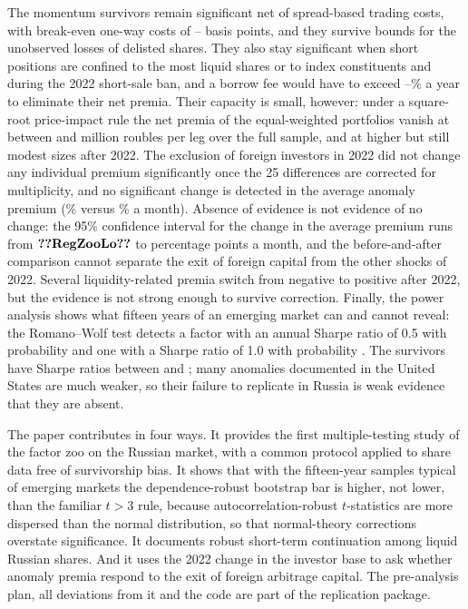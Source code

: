 \documentclass[11pt]{article}
\newcommand{\RW}{Romano--Wolf}
\begin{document}
The momentum survivors remain significant net of spread-based trading costs, with break-even one-way
costs of -- basis points, and they survive bounds for the unobserved losses of delisted
shares. They also stay significant when short positions are confined to the most liquid shares or to index
constituents and during the 2022 short-sale ban, and a borrow fee would have to exceed --\% a
year to eliminate their net premia. Their capacity is small, however: under a square-root price-impact rule the net
premia of the equal-weighted portfolios vanish at between  and  million roubles per leg
over the full sample, and at higher but still modest sizes after 2022. The exclusion of foreign investors in 2022 did not
change any individual premium significantly once the 25 differences are corrected for multiplicity, and no significant
change is detected in the average anomaly premium (\% versus \% a month). Absence of
evidence is not evidence of no change: the 95\% confidence interval for the change in the average premium runs from
$\val{RegZooLo}$ to  percentage points a month, and the before-and-after comparison cannot separate the exit
of foreign capital from the other shocks of 2022. Several liquidity-related premia switch from negative to positive after
2022, but the evidence is not strong enough to survive correction. Finally, the power analysis shows what fifteen years of an emerging market can and cannot
reveal: the \RW{} test detects a factor with an annual Sharpe ratio of 0.5 with probability  and
one with a Sharpe ratio of 1.0 with probability . The survivors have Sharpe ratios between
 and ; many anomalies documented in the United States are much weaker, so their
failure to replicate in Russia is weak evidence that they are absent.

The paper contributes in four ways. It provides the first multiple-testing study of the factor zoo on the
Russian market, with a common protocol applied to share data free of survivorship bias. It shows that with the fifteen-year samples typical
of emerging markets the dependence-robust bootstrap bar is higher, not lower, than the familiar $t>3$ rule, because
autocorrelation-robust $t$-statistics are more dispersed than the normal distribution, so that normal-theory
corrections overstate significance. It documents robust short-term continuation among liquid Russian shares. And it
uses the 2022 change in the investor base to ask whether anomaly premia respond to the
exit of foreign arbitrage capital. The pre-analysis plan, all deviations from it and the code are part of the
replication package.
\end{document}

